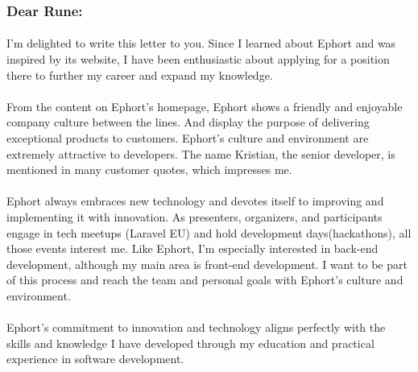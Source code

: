 
\subsubsection*{Dear Rune:}

\paragraph{}
I'm delighted to write this letter to you. Since I learned about Ephort and was inspired by its website, I have been enthusiastic about applying for a position there to further my career and expand my knowledge.

\paragraph{}
From the content on Ephort's homepage, Ephort shows a friendly and enjoyable company culture between the lines. And display the purpose of delivering exceptional products to customers. Ephort's culture and environment are extremely attractive to developers. The name Kristian, the senior developer, is mentioned in many customer quotes, which impresses me.

\paragraph{}
Ephort always embraces new technology and devotes itself to improving and implementing it with innovation. As presenters, organizers, and participants engage in tech meetups (Laravel EU) and hold development days(hackathons), all those events interest me. Like Ephort, I'm especially interested in back-end development, although my main area is front-end development. I want to be part of this process and reach the team and personal goals with Ephort's culture and environment. 

\paragraph{}
Ephort's commitment to innovation and technology aligns perfectly with the skills and knowledge I have developed through my education and practical experience in software development.

